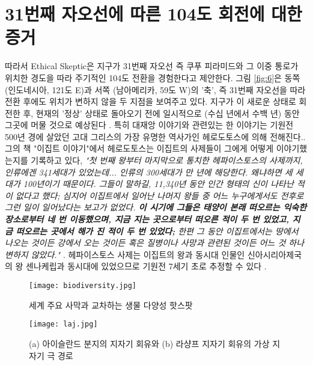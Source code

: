 \documentclass[10pt,twocolumn,letterpaper]{article}
\begin{document}
\section{31번째 자오선에 따른  104도 회전에 대한 증거}

따라서 Ethical Skeptic은 지구가 31번째 자오선 즉 쿠푸 피라미드와 그 이중 통로가 위치한 경도을 따라 주기적인 104도 전환을 경험한다고 제안한다. 그림 \ref{fig:6}은 동쪽 (인도네시아, 121도 E)과 서쪽 (남아메리카, 59도 W)의 '축', 즉 31번째 자오선을 따라 전환 후에도 위치가 변하지 않을 두 지점을 보여주고 있다. 지구가 이 새로운 상태로 회전한 후, 현재의 '정상' 상태로 돌아오기 전에 일시적으로 (수십 년에서 수백 년) 동안 그곳에 머물 것으로 예상된다 \cite{150}.
특히 대재앙 이야기와 관련있는 한 이야기는 기원전 500년 경에 살았던 고대 그리스의 가장 유명한 역사가인 헤로도토스에 의해 전해진다.\cite{31}. 그의 책 "이집트 이야기"에서 헤로도토스는 이집트의 사제들이 그에게 어떻게 이야기했는지를 기록하고 있다, \textit{"첫 번째 왕부터 마지막으로 통치한 헤파이스토스의 사제까지, 인류에겐  341세대가 있었는데... 인류의 300세대가 만 년에 해당한다. 왜냐하면 세 세대가 100년이기 때문이다. 그들이 말하길, 11,340년 동안 인간 형태의 신이 나타난 적이 없다고 했다; 심지어 이집트에서 일어난 나머지 왕들 중 어느 누구에게서도 전후로 그런 일이 일어났다는 보고가 없었다. \textbf{이 시기에 그들은 태양이 본래 떠오르는 익숙한 장소로부터 네 번 이동했으며, 지금 지는 곳으로부터 떠오른 적이 두 번 있었고, 지금 떠오르는 곳에서 해가 진 적이 두 번 있었다;} 한편 그 동안  이집트에서는 땅에서 나오는 것이든 강에서 오는 것이든 혹은 질병이나 사망과 관련된 것이든 어느 것 하나 변하지 않았다."} \cite{32}. 헤파이스토스 사제는 이집트의 왕과 동시대 인물인 신아시리아제국의 왕 센나케립과 동시대에 있었으므로 기원전 7세기 초로 추정할 수 있다 \cite{32,33,34}.

\begin{figure*}[t]
\begin{center}
\texttt{[image: biodiversity.jpg]}
\end{center}
   \caption{세계 주요 사막과 교차하는 생물 다양성 핫스팟 \cite{28}}
\label{fig:9}
\end{figure*}

\begin{figure}[t]
\begin{center}
   \texttt{[image: laj.jpg]}
\end{center}
   \caption{(a) 아이슬란드 분지의 지자기 회유와 (b) 라샹프 지자기 회유의 가상 지자기 극 경로 \cite{35}}
\label{fig:7}
\label{fig:onecol}
\end{figure}
\end{document}
